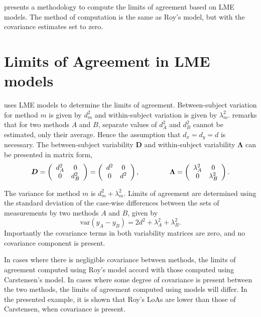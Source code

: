 \documentclass[12pt, a4paper]{report}
\theoremstyle{plain}
\theoremstyle{definition}
\theoremstyle{remark}
\begin{document}
\citet{BXC2008} presents a methodology to compute the limits of agreement based on LME models. The method of computation is the
same as Roy's model, but with the covariance estimates set to zero.

	\section{Limits of Agreement in LME models}
	\citet{BXC2008} uses LME models to determine the limits of agreement. Between-subject variation for method $m$ is given by $d^2_{m}$ and within-subject variation is given by $\lambda^2_{m}$.  \citet{BXC2008} remarks that for two methods $A$ and $B$, separate values of $d^2_{A}$ and $d^2_{B}$ cannot be estimated, only their average. Hence the assumption that $d_{x}= d_{y}= d$ is necessary. The between-subject variability $\boldsymbol{D}$ and within-subject variability $\boldsymbol{\Lambda}$ can be presented in matrix form,\[
	\boldsymbol{D} = \left(%
	\begin{array}{cc}
	d^2_{A}& 0 \\
	0 & d^2_{B} \\
	\end{array}%
	\right)=\left(%
	\begin{array}{cc}
	d^2& 0 \\
	0 & d^2\\
	\end{array}%
	\right),
	\hspace{1.5cm}
	\boldsymbol{\Lambda} = \left(%
	\begin{array}{cc}
	\lambda^2_{A}& 0 \\
	0 & \lambda^2_{B} \\
	\end{array}%
	\right).
	\]
	
	The variance for method $m$ is $d^2_{m}+\lambda^2_{m}$. Limits of agreement are determined using the standard deviation of the case-wise differences between the sets of measurements by two methods $A$ and $B$, given by
	\begin{equation}
	\mbox{var} (y_{A}-y_{B}) = 2d^2 + \lambda^2_{A}+ \lambda^2_{B}.
	\end{equation}
	Importantly the covariance terms in both variability matrices are zero, and no covariance component is present.
	
	
In cases where there is negligible covariance between methods, the limits of agreement computed using Roy's model accord with those computed using Carstensen's model. In cases where some degree of
covariance is present between the two methods, the limits of agreement computed using models will differ. In the presented
example, it is shown that Roy's LoAs are lower than those of Carstensen, when covariance is present.
\end{document}
